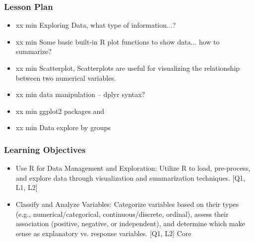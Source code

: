 

\begin{frame}
\frametitle{Lesson Plan}
\begin{itemize}
    \item xx min Exploring Data, what type of information...?
    \item xx min Some basic built-in R plot functions to show data... how to summarize?
    \item xx min Scatterplot, Scatterplots are useful for visualizing the relationship between two
    numerical variables.
    \item xx min data manipulation -- dplyr syntax? 
    \item xx min ggplot2 packages and  
    \item xx min Data explore by groups
\end{itemize}
\end{frame}


\begin{frame}
\frametitle{Learning Objectives}

\begin{itemize}
    \item Use R for Data Management and Exploration: Utilize R to load, pre-process, and explore data through visualization and summarization techniques. [Q1, L1, L2]
    \item Classify and Analyze Variables: Categorize variables based on their types (e.g., numerical/categorical, continuous/discrete, ordinal), assess their association (positive, negative, or independent), and determine which make sense as explanatory vs. response variables. [Q1, L2] Core
\end{itemize}
\end{frame}

